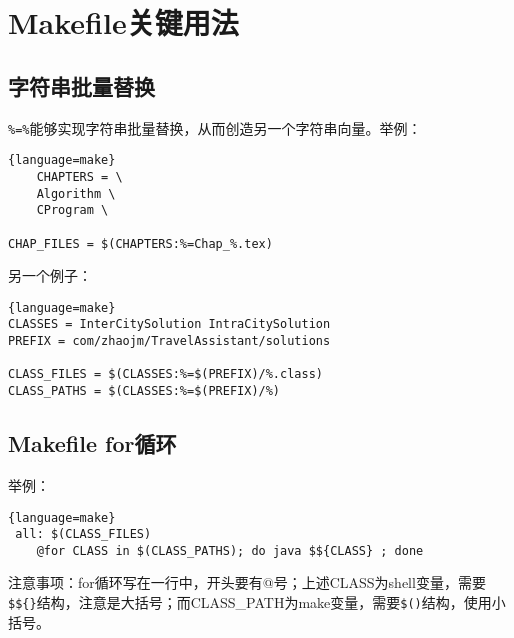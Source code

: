 
\section{Makefile关键用法}

\subsection{字符串批量替换}
\verb|%=%|能够实现字符串批量替换，从而创造另一个字符串向量。举例：
\begin{lstlisting}{language=make}
    CHAPTERS = \
    Algorithm \
    CProgram \

CHAP_FILES = $(CHAPTERS:%=Chap_%.tex)
\end{lstlisting}
另一个例子：
\begin{lstlisting}{language=make}
CLASSES = InterCitySolution IntraCitySolution
PREFIX = com/zhaojm/TravelAssistant/solutions

CLASS_FILES = $(CLASSES:%=$(PREFIX)/%.class)
CLASS_PATHS = $(CLASSES:%=$(PREFIX)/%)
\end{lstlisting}

\subsection{Makefile for循环}
举例：
\begin{lstlisting}{language=make}
 all: $(CLASS_FILES)
	@for CLASS in $(CLASS_PATHS); do java $${CLASS} ; done
\end{lstlisting}
注意事项：for循环写在一行中，开头要有@号；上述CLASS为shell变量，需要\verb|$${}|结构，注意是大括号；而CLASS\_PATH为make变量，需要\verb|$()|结构，使用小括号。


